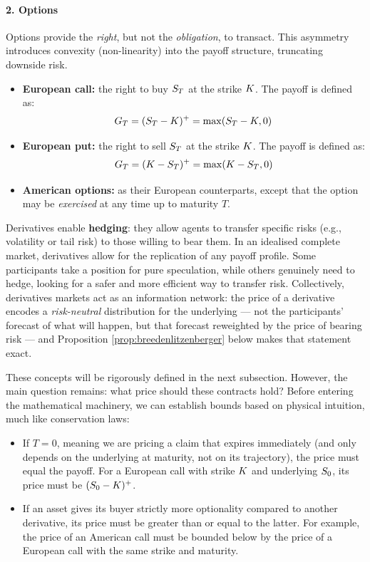 \paragraph{2. Options}
Options provide the \textit{right}, but not the \textit{obligation}, to transact. This asymmetry introduces convexity (non-linearity) into the payoff structure, truncating downside risk.
\begin{itemize}
    \item \textbf{European call:} the right to buy $S_T$ at the strike $K$. The payoff is defined as:
    \begin{equation}
        G_T = (S_T - K)^+ = \max(S_T - K, 0)
    \end{equation}
    \item \textbf{European put:} the right to sell $S_T$ at the strike $K$. The payoff is defined as:
    \begin{equation}
        G_T = (K - S_T)^+ = \max(K - S_T, 0)
    \end{equation}
        \item \textbf{American options:} as their European counterparts, except that the option may be \textit{exercised} at any time up to maturity $T$.
\end{itemize}

Derivatives enable \textbf{hedging}: they allow agents to transfer specific risks (e.g., volatility or tail risk) to those willing to bear them. In an idealised complete market, derivatives allow for the replication of any payoff profile. Some participants take a position for pure speculation, while others genuinely need to hedge, looking for a safer and more efficient way to transfer risk. Collectively, derivatives markets act as an information network: the price of a derivative encodes a \emph{risk-neutral} distribution for the underlying --- not the participants' forecast of what will happen, but that forecast reweighted by the price of bearing risk --- and Proposition \ref{prop:breedenlitzenberger} below makes that statement exact.

These concepts will be rigorously defined in the next subsection. However, the main question remains: what price should these contracts hold? Before entering the mathematical machinery, we can establish bounds based on physical intuition, much like conservation laws:
\begin{itemize}
    \item If $T=0$, meaning we are pricing a claim that expires immediately (and only depends on the underlying at maturity, not on its trajectory), the price must equal the payoff. For a European call with strike $K$ and underlying $S_0$, its price must be $(S_0-K)^+$.
    \item If an asset gives its buyer strictly more optionality compared to another derivative, its price must be greater than or equal to the latter. For example, the price of an American call must be bounded below by the price of a European call with the same strike and maturity.
\end{itemize}

